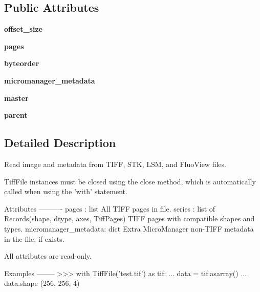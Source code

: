 \subsection*{Public Attributes}
\begin{DoxyCompactItemize}
\item 
\hypertarget{classtifffile_1_1TiffFile_ab531ab5699a9b426c32e26444e8e53ac}{{\bfseries offset\-\_\-size}}\label{classtifffile_1_1TiffFile_ab531ab5699a9b426c32e26444e8e53ac}

\item 
\hypertarget{classtifffile_1_1TiffFile_a38687a2ea2711cef070cf0b9ddb4e65f}{{\bfseries pages}}\label{classtifffile_1_1TiffFile_a38687a2ea2711cef070cf0b9ddb4e65f}

\item 
\hypertarget{classtifffile_1_1TiffFile_a9482f0d20fef11df3b9baaa04f8a7bb6}{{\bfseries byteorder}}\label{classtifffile_1_1TiffFile_a9482f0d20fef11df3b9baaa04f8a7bb6}

\item 
\hypertarget{classtifffile_1_1TiffFile_ad38661d0b0a16180347517d5ff208afd}{{\bfseries micromanager\-\_\-metadata}}\label{classtifffile_1_1TiffFile_ad38661d0b0a16180347517d5ff208afd}

\item 
\hypertarget{classtifffile_1_1TiffFile_acc082b0de522251b75669336fe57b005}{{\bfseries master}}\label{classtifffile_1_1TiffFile_acc082b0de522251b75669336fe57b005}

\item 
\hypertarget{classtifffile_1_1TiffFile_a29b8b6eb049a61de92b16223f75492e0}{{\bfseries parent}}\label{classtifffile_1_1TiffFile_a29b8b6eb049a61de92b16223f75492e0}

\end{DoxyCompactItemize}


\subsection{Detailed Description}
\begin{DoxyVerb}Read image and metadata from TIFF, STK, LSM, and FluoView files.

TiffFile instances must be closed using the close method, which is
automatically called when using the 'with' statement.

Attributes
----------
pages : list
    All TIFF pages in file.
series : list of Records(shape, dtype, axes, TiffPages)
    TIFF pages with compatible shapes and types.
micromanager_metadata: dict
    Extra MicroManager non-TIFF metadata in the file, if exists.

All attributes are read-only.

Examples
--------
>>> with TiffFile('test.tif') as tif:
...     data = tif.asarray()
...     data.shape
(256, 256, 4)\end{DoxyVerb}
 

